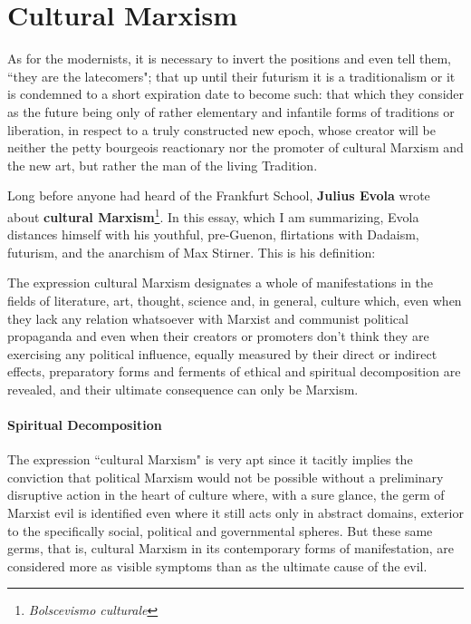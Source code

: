 \section{Cultural Marxism}

\begin{quotex}
As for the modernists, it is necessary to invert the positions and even tell them, ``they are the latecomers"; that up until their futurism it is a traditionalism or it is condemned to a short expiration date to become such: that which they consider as the future being only of rather elementary and infantile forms of traditions or liberation, in respect to a truly constructed new epoch, whose creator will be neither the petty bourgeois reactionary nor the promoter of cultural Marxism and the new art, but rather the man of the living Tradition. 

\end{quotex}
Long before anyone had heard of the Frankfurt School, \textbf{Julius Evola} wrote about \textbf{cultural Marxism}\footnote{\textit{Bolscevismo culturale}}. In this essay, which I am summarizing, Evola distances himself with his youthful, pre-Guenon, flirtations with Dadaism, futurism, and the anarchism of Max Stirner. This is his definition:

\begin{quotex}
The expression cultural Marxism designates a whole of manifestations in the fields of literature, art, thought, science and, in general, culture which, even when they lack any relation whatsoever with Marxist and communist political propaganda and even when their creators or promoters don't think they are exercising any political influence, equally measured by their direct or indirect effects, preparatory forms and ferments of ethical and spiritual decomposition are revealed, and their ultimate consequence can only be Marxism.

\end{quotex}
\paragraph{Spiritual Decomposition}
The expression ``cultural Marxism" is very apt since it tacitly implies the conviction that political Marxism would not be possible without a preliminary disruptive action in the heart of culture where, with a sure glance, the germ of Marxist evil is identified even where it still acts only in abstract domains, exterior to the specifically social, political and governmental spheres. But these same germs, that is, cultural Marxism in its contemporary forms of manifestation, are considered more as visible symptoms than as the ultimate cause of the evil.

